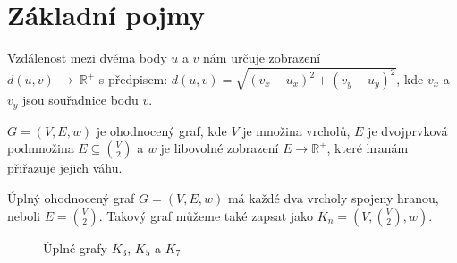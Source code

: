 \section{Základní pojmy}
\label{sec:zakladni-pojmy}

\begin{definition}[Vzdálenost]
    \label{definice:vzdalenost}
    Vzdálenost mezi dvěma body $u$ a $v$ nám určuje zobrazení \\$d(u, v)~\rightarrow~\mathds{R}^+$ s předpisem: $d(u, v) = \sqrt{(v_x-u_x)^2+(v_y-u_y)^2}$, kde $v_x$ a $v_y$ jsou souřadnice bodu $v$. 
\end{definition}

\begin{definition}
    \label{definice:ohodnoceny_graf}
    $G = (V, E, w)$ je ohodnocený graf, kde $V$ je množina vrcholů, $E$ je dvojprvková podmnožina $E \subseteq \binom{V}{2}$ a $w$ je libovolné zobrazení $E \rightarrow \mathds{R}^+$, které hranám přiřazuje jejich váhu.
\end{definition}

\begin{definition}
    \label{definice:uplny_ohodnoceny_graf}
    Úplný ohodnocený graf $G = (V, E, w)$ má každé dva vrcholy spojeny hranou, neboli $E = \binom{V}{2}$. Takový graf můžeme také zapsat jako $K_n = (V, \binom{V}{2}, w)$.
    \begin{figure}[h]
        \centering
        \begin{subfigure}[b]{0.3\textwidth}
            \centering
        \end{subfigure}
        \begin{subfigure}[b]{0.3\textwidth}
            \centering
        \end{subfigure}
        \begin{subfigure}[b]{0.3\textwidth}
            \centering
        \end{subfigure}
        \caption{Úplné grafy $K_3$, $K_5$ a $K_7$}
        \label{obr:uplne_ohodnocene_grafy}

    \end{figure}
\end{definition}

